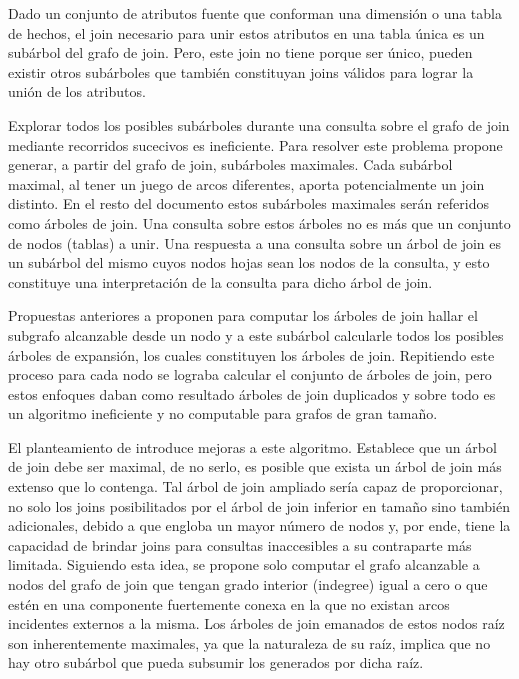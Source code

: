Dado un conjunto de atributos fuente que conforman una dimensi\'on o una tabla de hechos, el join necesario 
para unir estos atributos en una tabla \'unica es un sub\'arbol del grafo de join. Pero, este join no tiene 
porque ser \'unico, pueden existir otros sub\'arboles que tambi\'en constituyan joins v\'alidos para lograr 
la uni\'on de los atributos. 

Explorar todos los posibles sub\'arboles durante una consulta sobre el grafo de join mediante 
recorridos sucecivos es ineficiente. Para resolver este problema \cite{mason2005autojoin} propone 
generar, a partir del grafo de join, sub\'arboles maximales. Cada sub\'arbol maximal, al tener un juego 
de arcos diferentes, aporta potencialmente un join distinto. En el resto del documento estos sub\'arboles 
maximales ser\'an referidos como \'arboles de join. Una consulta sobre estos \'arboles no es m\'as que 
un conjunto de nodos (tablas) a unir. Una respuesta a una consulta sobre un \'arbol de join es un sub\'arbol 
del mismo cuyos nodos hojas sean los nodos de la consulta, y esto constituye una interpretaci\'on 
de la consulta para dicho  \'arbol de join.

Propuestas anteriores a \cite{mason2005autojoin} proponen para computar los \'arboles de join hallar 
el subgrafo alcanzable desde un nodo y a este sub\'arbol calcularle todos los posibles \'arboles de 
expansi\'on, los cuales constituyen los \'arboles de join. Repitiendo este proceso para cada nodo se lograba 
calcular el conjunto de \'arboles de join, 
pero estos enfoques daban como resultado \'arboles de join duplicados y sobre todo 
es un algoritmo ineficiente y no computable para grafos de gran tamaño.

El planteamiento de \cite{mason2005autojoin} introduce mejoras a este algoritmo. Establece que un \'arbol 
de join debe ser maximal, de no serlo, es posible que exista un \'arbol de join m\'as extenso que lo contenga. 
Tal \'arbol de join ampliado sería capaz de proporcionar, no solo 
los joins posibilitados por el \'arbol de join inferior en tamaño sino también adicionales, debido a que engloba 
un mayor número de nodos y, por ende, tiene la capacidad de brindar joins para consultas inaccesibles a su 
contraparte más limitada. Siguiendo esta idea, se propone solo computar el grafo alcanzable 
a nodos del grafo de join que tengan grado interior (indegree) igual a cero o que est\'en en una 
componente fuertemente conexa en la que no existan arcos incidentes externos a la misma. 
Los \'arboles de join emanados de estos nodos raíz son inherentemente maximales, ya que la naturaleza de su raíz, 
implica que no hay otro subárbol que pueda subsumir los generados por dicha raíz.

